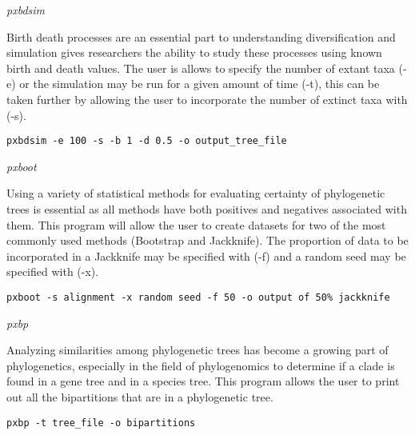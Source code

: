 \documentclass[12pt,letterpaper]{article}
\renewcommand{\subsection}[1]{%
\bigskip
\begin{center}
\begin{large}
\normalfont\itshape #1
\end{large}
\end{center}}
\begin{document}
\subsection{pxbdsim}

Birth death processes are an essential part to understanding diversification and simulation gives researchers the ability to study these processes using known birth and death values. The user is allows to specify the number of extant taxa (-e) or the simulation may be run for a given amount of time (-t), this can be taken further by allowing the user to incorporate the number of extinct taxa with (-s).

\begin{flushleft}
\begin{verbatim}
pxbdsim -e 100 -s -b 1 -d 0.5 -o output_tree_file
\end{verbatim}
\end{flushleft}

\subsection{pxboot}

Using a variety of statistical methods for evaluating certainty of phylogenetic trees is essential as all methods have both positives and negatives associated with them. This program will allow the user to create datasets for two of the most commonly used methods (Bootstrap and Jackknife). The proportion of data to be incorporated in a Jackknife may be specified with (-f) and a random seed may be specified with (-x).
\begin{flushleft}
\begin{verbatim}
pxboot -s alignment -x random seed -f 50 -o output of 50% jackknife
\end{verbatim}
\end{flushleft}

\subsection{pxbp}

Analyzing similarities among phylogenetic trees has become a growing part of phylogenetics, especially in the field of phylogenomics to determine if a clade is found in a gene tree and in a species tree. This program allows the user to print out all the bipartitions that are in a phylogenetic tree.

\begin{flushleft}
\begin{verbatim}
pxbp -t tree_file -o bipartitions
\end{verbatim}
\end{flushleft}
\end{document}

